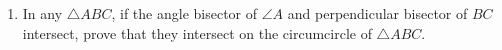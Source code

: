 \begin{enumerate}[label=\thesection.\arabic*,ref=\thesection.\theenumi]
\item In any $\triangle ABC$, if the angle bisector of $\angle A$ and 
    perpendicular bisector of $BC$ intersect, prove that they intersect on 
    the circumcircle of $\triangle ABC$.
\\
    \solution 
\label{chapters/9/10/6/10}


\end{enumerate}
